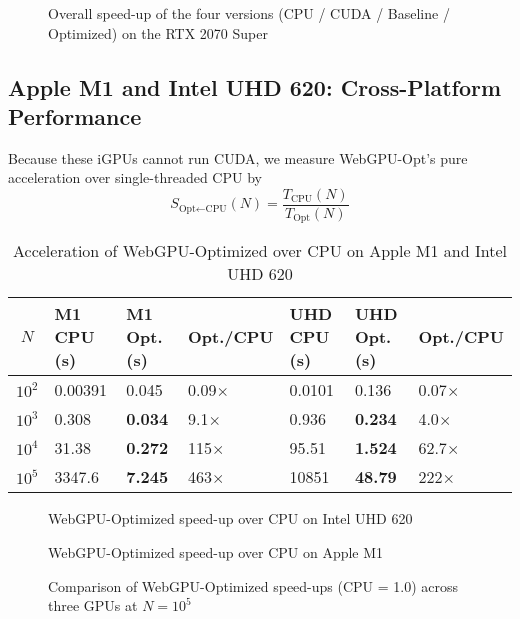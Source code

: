 \documentclass[12pt]{report}
\begin{document}
\begin{figure}[h]
    \caption{Overall speed-up of the four versions (CPU / CUDA / Baseline / Optimized) on the RTX 2070 Super}
    \label{fig:2070s-4}
\end{figure}

\subsection{Apple M1 and Intel UHD 620: Cross-Platform Performance}
Because these iGPUs cannot run CUDA, we measure WebGPU-Opt’s pure acceleration over single-threaded CPU by
\[
S_{\text{Opt} \leftarrow \text{CPU}}(N) = \frac{T_{\text{CPU}}(N)}{T_{\text{Opt}}(N)}
\]

\begin{table}[h]
    \centering
    \begin{tabularx}{\textwidth}{|c|X|X|X|X|X|X|}
        \hline
        $N$ & M1 CPU (s) & \textbf{M1 Opt. (s)} & Opt./CPU & UHD CPU (s) & \textbf{UHD Opt. (s)} & Opt./CPU \\
        \hline
        $10^2$ & 0.00391 & 0.045 & 0.09$\times$ & 0.0101 & 0.136 & 0.07$\times$ \\
        $10^3$ & 0.308 & \textbf{0.034} & 9.1$\times$ & 0.936 & \textbf{0.234} & 4.0$\times$ \\
        $10^4$ & 31.38 & \textbf{0.272} & 115$\times$ & 95.51 & \textbf{1.524} & 62.7$\times$ \\
        $10^5$ & 3347.6 & \textbf{7.245} & 463$\times$ & 10851 & \textbf{48.79} & 222$\times$ \\
        \hline
    \end{tabularx}
    \caption{Acceleration of WebGPU-Optimized over CPU on Apple M1 and Intel UHD 620}
    \label{tab:cross_platform}
\end{table}

\begin{figure}[h]
    \caption{WebGPU-Optimized speed-up over CPU on Intel UHD 620}
    \label{fig:uhd620}
\end{figure}

\begin{figure}[h]
    \caption{WebGPU-Optimized speed-up over CPU on Apple M1}
    \label{fig:m1}
\end{figure}

\begin{figure}[h]
    \caption{Comparison of WebGPU-Optimized speed-ups (CPU = 1.0) across three GPUs at $N=10^5$}
    \label{fig:cross-hw}
\end{figure}
\end{document}
